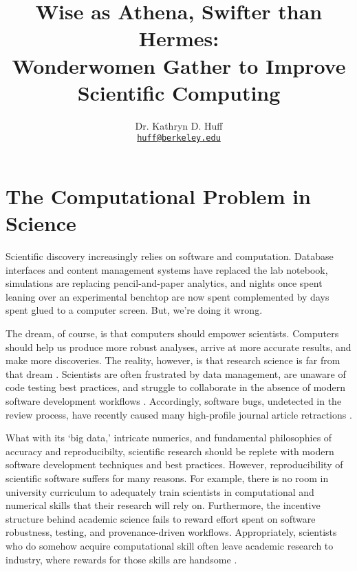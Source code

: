 \documentclass[letterpaper]{article}
\author{Dr. Kathryn D. Huff
  \\ \href{mailto:huff@berkeley.edu}{\texttt{huff@berkeley.edu}}
}
\date{}
\title{Wise as Athena, Swifter than Hermes:\\
Wonderwomen Gather to Improve Scientific Computing}
\begin{document}
\maketitle

\section*{The Computational Problem in Science}

Scientific discovery increasingly relies on 
software and computation. Database interfaces and content 
management systems have replaced the lab notebook, simulations are replacing 
pencil-and-paper analytics, and nights once spent leaning over an experimental 
benchtop are now spent complemented by days spent glued to a computer screen. 
But, we're doing it wrong. 

The dream, of course, is that computers should empower scientists. Computers 
should help us produce more robust analyses, arrive at more accurate results, 
and make more discoveries. 
The reality, however, is that research science is far from that dream 
\cite{hatton_t_1997,merali_computational_2010,joppa_troubling_2013} .  
Scientists are often frustrated by data management, are unaware of code testing 
best practices, and struggle to collaborate in the absence of modern software 
development workflows 
\cite{ackroyd_scientific_2008,segal_when_2005,hannay_how_2009,dubois_why_2003}.  
Accordingly, software bugs, undetected in the review process, have recently 
caused many high-profile journal article retractions 
\cite{hypertension2012,chang2007,jaccretract2013,miller2006}.

What with its `big data,' intricate numerics, and fundamental philosophies of 
accuracy and reproducibilty,  scientific research should be replete with modern 
software development techniques and best practices. However, reproducibility of 
scientific software suffers for many reasons. For example, there is no room in 
university curriculum to adequately train scientists in computational and 
numerical skills that their research will rely on. Furthermore, the incentive 
structure behind academic science fails to reward effort spent on software 
robustness, testing, and provenance-driven workflows. Appropriately, scientists 
who do somehow acquire computational skill often leave academic research 
to industry, where rewards for those skills are handsome \cite{vanderplas_big_2013}.  
\end{document}

